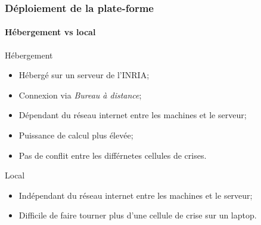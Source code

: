 \documentclass{beamer}
\begin{document}
		\begin{frame}
			\frametitle{Déploiement de la plate-forme}
			\framesubtitle{Hébergement vs local}
			\begin{block}{Hébergement}
				\begin{itemize}
					\item Hébergé sur un serveur de l'INRIA;
					\item Connexion via \textit{Bureau à distance};
					\item Dépendant du réseau internet entre les machines et le serveur;
					\item Puissance de calcul plus élevée;
					\item Pas de conflit entre les différnetes cellules de crises.
				\end{itemize}
			\end{block}
			\begin{block}{Local}
				\begin{itemize}
					\item Indépendant du réseau internet entre les machines et le serveur;
					\item Difficile de faire tourner plus d'une cellule de crise sur un laptop.
				\end{itemize}
			\end{block}
		\end{frame}
\end{document}
